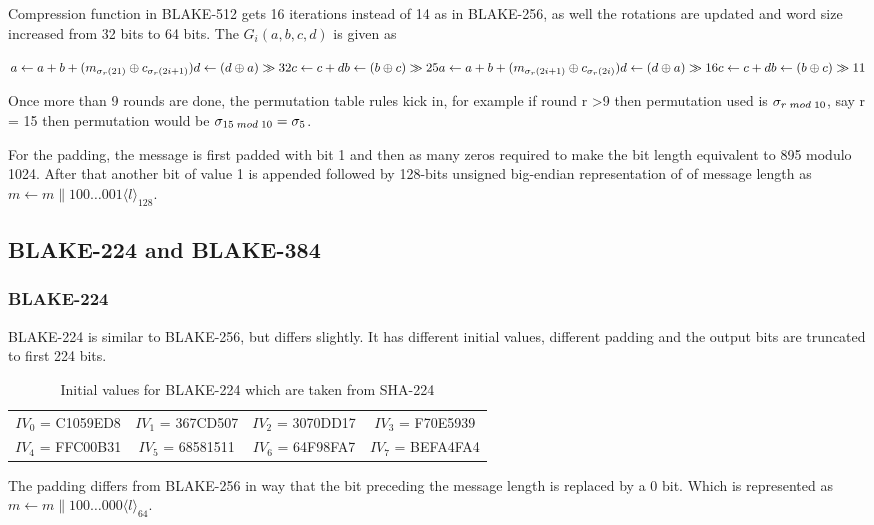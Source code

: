   Compression function in BLAKE-512 gets 16 iterations instead of 14 as in BLAKE-256, as well the rotations
  are updated and word size increased from 32 bits to 64 bits. The $G_{i}(a, b, c, d)$ 
  is given as 

  $
  a \gets a + b + (m_{\sigma_{r}(21)} \oplus c_{\sigma_{r}(2i + 1)}) \\
  d \gets (d \oplus a) \gg 32 \\
  c \gets c + d \\
  b \gets (b \oplus c) \gg 25 \\
  a \gets a + b + (m_{\sigma_{r}(2i + 1)} \oplus c_{\sigma_{r}(2i)}) \\
  d \gets (d \oplus a) \gg 16 \\
  c \gets c + d \\
  b \gets (b \oplus c) \gg 11
  $
  
  Once more than 9 rounds are done, the permutation table rules kick in, for example if round r \textgreater 9 then
  permutation used is $\sigma_{r \thickspace mod \thickspace 10}$, say r = 15 then permutation would be 
  $\sigma_{15 \thickspace mod \thickspace 10} = \sigma_{5}$.

  For the padding, the message is first padded with bit 1 and then as many zeros required to make the bit length
  equivalent to 895 modulo 1024. After that another bit of value 1 is appended followed by 128-bits unsigned big-endian
  representation of of message length as $m \gets m \parallel 100 \dots 001 \langle l \rangle_{128}$.

\subsection{BLAKE-224 and BLAKE-384}

  \subsubsection{BLAKE-224}
  BLAKE-224 is similar to BLAKE-256, but differs slightly. It has different initial values, different padding and the
  output bits are truncated to first 224 bits.
  \begin{table}[h]
    \begin{center}
      \begin{tabular}{ *{4}{c}}
        $IV_{0}$ = C1059ED8 & $IV_{1}$ = 367CD507 & $IV_{2}$ = 3070DD17 & $IV_{3}$ = F70E5939 \\
        $IV_{4}$ = FFC00B31 & $IV_{5}$ = 68581511 & $IV_{6}$ = 64F98FA7 & $IV_{7}$ = BEFA4FA4 \\
      \end{tabular}
      \caption{Initial values for BLAKE-224 which are taken from SHA-224\cite{00002}}
    \end{center}
  \end{table}
  The padding differs from BLAKE-256 in way that the bit preceding the message length is replaced by a 0 bit. Which
  is represented as $m \gets m \parallel 100 \dots 000 \langle l \rangle_{64}$.

